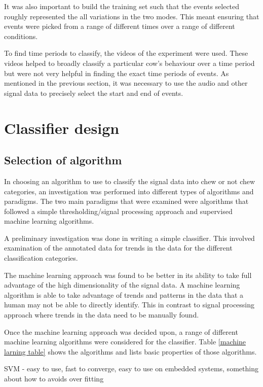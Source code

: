 It was also important to build the training set such that the events selected roughly represented the all variations in the two modes. This meant ensuring that events were picked from a range of different times over a range of different conditions.

To find time periods to classify, the videos of the experiment were used. These videos helped to broadly classify a particular cow's behaviour over a time period but were not very helpful in finding the exact time periods of events. As mentioned in the previous section, it was necessary to use the audio and other signal data to precisely select the start and end of events. 

\section{Classifier design}

\subsection{Selection of algorithm}

In choosing an algorithm to use to classify the signal data into chew or not chew categories, an investigation was performed into different types of algorithms and paradigms. The two main paradigms that were examined were algorithms that followed a simple thresholding/signal processing approach and supervised machine learning algorithms. 

A preliminary investigation was done in writing a simple classifier. This involved examination of the annotated data for trends in the data for the different classification categories.  

The machine learning approach was found to be better in its ability to take full advantage of the high dimensionality of the signal data. A machine learning algorithm is able to take advantage of trends and patterns in the data that a human may not be able to directly identify. This in contrast to signal processing approach where trends in the data need to be manually found.

Once the machine learning approach was decided upon, a range of different machine learning algorithms were considered for the classifier. Table \ref{machine larning table} shows the algorithms and lists basic properties of those algorithms. 

SVM - easy to use, fast to converge, easy to use on embedded systems, something about how to avoids over fitting

